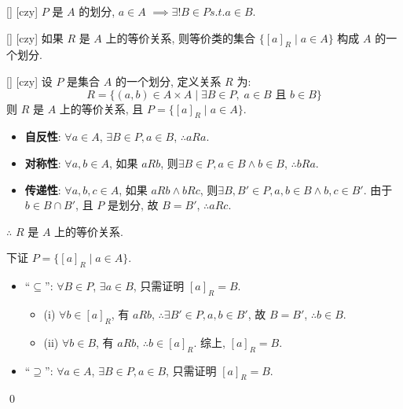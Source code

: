 \documentclass[UTF8]{ctexart}
\begin{document}
        \begin{lma}
            [UUID]
            {}
            []
            [czy]
            \( P \) 是 \( A \) 的划分, \( a \in A \) \(\implies \exists ! B \in P s.t. a \in B \). 
        \end{lma}

        \begin{thm}
            [UUID]
            {}
            []
            [czy]
            如果 \( R \) 是 \( A \) 上的等价关系, 则等价类的集合 \( \{ {[a]}_R \mid a \in A \} \) 构成 \( A \) 的一个划分. 
        \end{thm}
        
        \begin{thm}
            [UUID]
            {}
            []
            [czy]
            设 \( P \) 是集合 \( A \) 的一个划分, 定义关系 \( R \) 为: 
            \[
            R = \{ (a, b) \in A \times A \mid \exists B \in P, \; a \in B \text{ 且 } b \in B \}
            \]
            则 \( R \) 是 \( A \) 上的等价关系, 且 \( P = \{ {[a]}_R \mid a \in A \} \). 
        \end{thm}

        \begin{prf}
            \begin{itemize}
                \item \textbf{自反性}: \(\forall a \in A \), \(\exists B \in P ,  a \in B \), \(\therefore a R a \). 
                \item \textbf{对称性}: \(\forall a, b \in A \), 如果 \( a R b \), 则\(\exists B \in P ,  a \in B \land b \in B \), \(\therefore b R a \). 
                \item \textbf{传递性}: \(\forall a, b, c \in A \), 如果 \( a R b \land b R c \), 则\(\exists B, B' \in P ,  a, b \in B \land b, c \in B' \). 由于 \( b \in B \cap B' \), 且 \( P \) 是划分, 故 \( B = B' \), \(\therefore a R c \). 
            \end{itemize}

            \(\therefore\) \( R \) 是 \( A \) 上的等价关系.

            下证 \( P = \{ {[a]}_R \mid a \in A \} \).

            \begin{itemize}
                \item “\(\subseteq\)”: \(\forall B \in P \), \(\exists a \in B \), 只需证明 \( {[a]}_R = B \). 
                \begin{itemize}
                    \item (i) \(\forall b \in {[a]}_R \), 有 \( a R b \), \(\therefore \exists B' \in P ,  a, b \in B' \), 故 \( B = B' \), \(\therefore b \in B \). 
                    \item (ii) \(\forall b \in B \), 有 \( a R b \), \(\therefore b \in {[a]}_R \). 综上, \( {[a]}_R = B \). 
                \end{itemize}
                \item “\(\supseteq\)”: \(\forall a \in A \), \(\exists B \in P ,  a \in B \), 只需证明 \( {[a]}_R = B \). 
            \end{itemize}
            \qed
        \end{prf}
\end{document}
